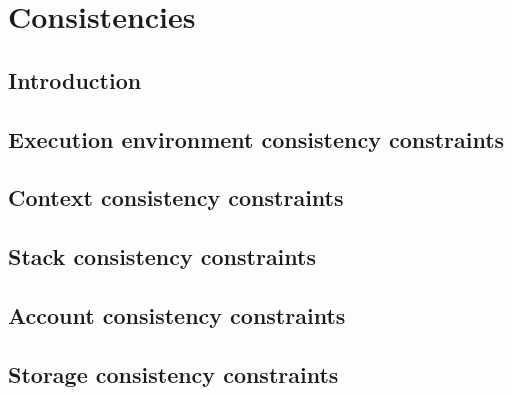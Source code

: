 

\section{Consistencies}                                                      \label{hub: consistencies}
\subsection{Introduction}                                                    \label{hub: consistencies: intro}                          \newpage
\subsection{Execution environment consistency constraints \lispDone{}}       \label{hub: consistencies: environment}      \newpage
\subsection{Context               consistency constraints \lispDone{}}       \label{hub: consistencies: context}              \newpage
\subsection{Stack                 consistency constraints \lispDone{}}       \label{hub: consistencies: stack}                  \newpage
\subsection{Account               consistency constraints \lispDone{}}       \label{hub: consistencies: account}              \newpage
\subsection{Storage               consistency constraints \lispDone{}}       \label{hub: consistencies: storage}              \newpage
